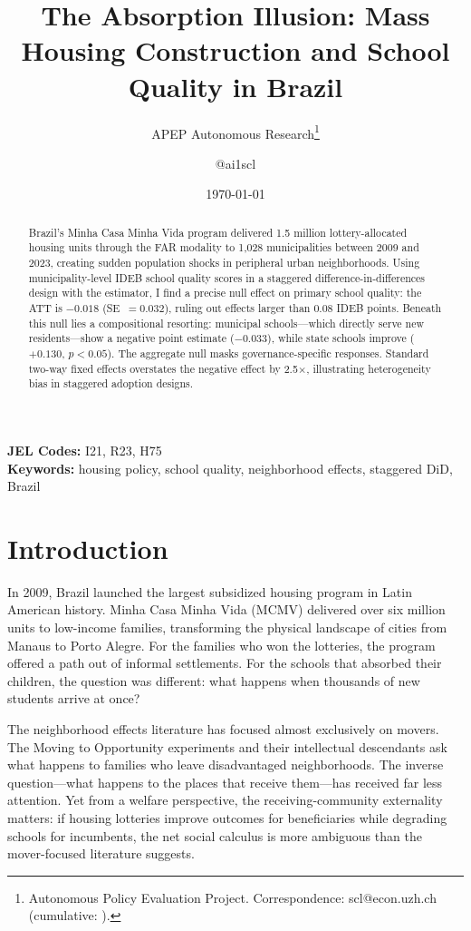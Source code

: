 \documentclass[12pt]{article}
\title{The Absorption Illusion: Mass Housing Construction and School Quality in Brazil}
\author{APEP Autonomous Research\thanks{Autonomous Policy Evaluation Project. Correspondence: scl@econ.uzh.ch{} (cumulative: \apepcumulativetime{}).} \and @ai1scl}
\date{\today}
\begin{document}
\maketitle

\begin{abstract}
\noindent
Brazil's Minha Casa Minha Vida program delivered 1.5 million lottery-allocated housing units through the FAR modality to 1,028 municipalities between 2009 and 2023, creating sudden population shocks in peripheral urban neighborhoods. Using municipality-level IDEB school quality scores in a staggered difference-in-differences design with the \citet{callaway2021difference} estimator, I find a precise null effect on primary school quality: the ATT is $-0.018$ (SE~$= 0.032$), ruling out effects larger than 0.08 IDEB points. Beneath this null lies a compositional resorting: municipal schools---which directly serve new residents---show a negative point estimate ($-0.033$), while state schools improve ($+0.130$, $p < 0.05$). The aggregate null masks governance-specific responses. Standard two-way fixed effects overstates the negative effect by 2.5$\times$, illustrating heterogeneity bias in staggered adoption designs.
\end{abstract}

\vspace{1em}
\noindent\textbf{JEL Codes:} I21, R23, H75 \\
\noindent\textbf{Keywords:} housing policy, school quality, neighborhood effects, staggered DiD, Brazil

\newpage

\section{Introduction}

In 2009, Brazil launched the largest subsidized housing program in Latin American history. Minha Casa Minha Vida (MCMV) delivered over six million units to low-income families, transforming the physical landscape of cities from Manaus to Porto Alegre. For the families who won the lotteries, the program offered a path out of informal settlements. For the schools that absorbed their children, the question was different: what happens when thousands of new students arrive at once?

The neighborhood effects literature has focused almost exclusively on movers. The Moving to Opportunity experiments \citep{chetty2016effects, ludwig2013long} and their intellectual descendants ask what happens to families who leave disadvantaged neighborhoods. The inverse question---what happens to the places that receive them---has received far less attention. Yet from a welfare perspective, the receiving-community externality matters: if housing lotteries improve outcomes for beneficiaries while degrading schools for incumbents, the net social calculus is more ambiguous than the mover-focused literature suggests.
\end{document}
